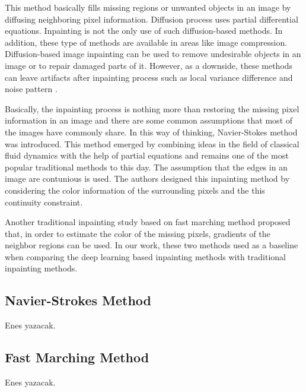 This method basically fills missing regions or unwanted objects in an image by diffusing neighboring pixel information. Diffusion process uses partial differential equations. Inpainting is not the only use of such diffusion-based methods. In addition, these type of methods are available in areas like image compression. Diffusion-based image inpainting can be used to remove undesirable objects in an image or to repair damaged parts of it. However, as a downside, these methods can leave artifacts after inpainting process such as local variance difference and noise pattern \cite{diffusion_based_artifacts}.

Basically, the inpainting process is nothing more than restoring the missing pixel information in an image and there are some common assumptions that most of the images have commonly share. In this way of thinking, Navier-Stokes method \cite{navier_stokes} was introduced. This method emerged by combining ideas in the field of classical fluid dynamics with the help of partial equations and remains one of the most popular traditional methods to this day. The assumption that the edges in an image are contunious is used. The authors designed this inpainting method by considering the color information of the surrounding pixels and the this continuity constraint.

Another traditional inpainting study based on fast marching method \cite{telea} proposed that, in order to estimate the color of the missing pixels, gradients of the neighbor regions can be used. In our work, these two methods used as a baseline when comparing the deep learning based inpainting methods with traditional inpainting methods.

\subsection{Navier-Strokes Method}

Enes yazacak.

\subsection{Fast Marching Method}

Enes yazacak.